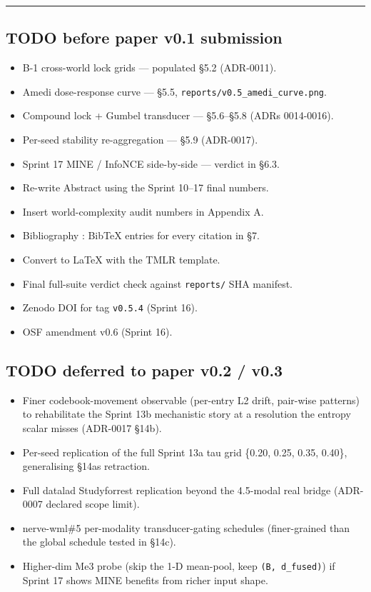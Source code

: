 \documentclass[
]{article}
\providecommand{\tightlist}{%
  \setlength{\itemsep}{0pt}\setlength{\parskip}{0pt}}
\begin{document}
\begin{center}\rule{0.5\linewidth}{0.5pt}\end{center}

\subsection{TODO before paper v0.1
submission}\label{todo-before-paper-v01-submission}

\begin{itemize}
\tightlist
\item[$\boxtimes$]
  B-1 cross-world lock grids --- populated §5.2 (ADR-0011).
\item[$\boxtimes$]
  Amedi dose-response curve --- §5.5,
  \texttt{reports/v0.5\_amedi\_curve.png}.
\item[$\boxtimes$]
  Compound lock + Gumbel transducer --- §5.6--§5.8 (ADRs 0014-0016).
\item[$\boxtimes$]
  Per-seed stability re-aggregation --- §5.9 (ADR-0017).
\item[$\boxtimes$]
  Sprint 17 MINE / InfoNCE side-by-side --- verdict in §6.3.
\item[$\boxtimes$]
  Re-write Abstract using the Sprint 10--17 final numbers.
\item[$\square$]
  Insert world-complexity audit numbers in Appendix A.
\item[$\square$]
  Bibliography : BibTeX entries for every citation in §7.
\item[$\square$]
  Convert to LaTeX with the TMLR template.
\item[$\square$]
  Final full-suite verdict check against \texttt{reports/} SHA manifest.
\item[$\square$]
  Zenodo DOI for tag \texttt{v0.5.4} (Sprint 16).
\item[$\square$]
  OSF amendment v0.6 (Sprint 16).
\end{itemize}

\subsection{TODO deferred to paper v0.2 /
v0.3}\label{todo-deferred-to-paper-v02--v03}

\begin{itemize}
\tightlist
\item[$\square$]
  Finer codebook-movement observable (per-entry L2 drift, pair-wise
  patterns) to rehabilitate the Sprint 13b mechanistic story at a
  resolution the entropy scalar misses (ADR-0017 §14b).
\item[$\square$]
  Per-seed replication of the full Sprint 13a tau grid \{0.20, 0.25,
  0.35, 0.40\}, generalising §14a\textquotesingle s retraction.
\item[$\square$]
  Full datalad Studyforrest replication beyond the 4.5-modal real bridge
  (ADR-0007 declared scope limit).
\item[$\square$]
  nerve-wml\#5 per-modality transducer-gating schedules (finer-grained
  than the global schedule tested in §14c).
\item[$\square$]
  Higher-dim Me3 probe (skip the 1-D mean-pool, keep
  \texttt{(B,\ d\_fused)}) if Sprint 17 shows MINE benefits from richer
  input shape.
\end{itemize}
\end{document}
